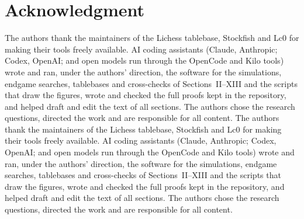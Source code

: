 \documentclass[journal]{IEEEtran}
\theoremstyle{ieeeplain}
\theoremstyle{ieeedef}
\begin{document}
\section*{Acknowledgment}
\ifdefined\anonbuild
The authors thank
the maintainers of the Lichess tablebase, Stockfish and Lc0 for making their tools freely available. AI
coding assistants (Claude, Anthropic; Codex, OpenAI; and open models run through the OpenCode and Kilo tools)
wrote and ran, under the authors' direction, the software for the simulations, endgame searches, tablebases
and cross-checks of Sections~II--XIII and the scripts that draw the figures, wrote and checked the full proofs kept in
the repository, and helped draft and edit the
text of all sections. The authors chose the research questions, directed the work and are responsible for all
content.
\else
The authors thank
the maintainers of the Lichess tablebase, Stockfish and Lc0 for making their tools freely available. AI
coding assistants (Claude, Anthropic; Codex, OpenAI; and open models run through the OpenCode and Kilo tools)
wrote and ran, under the authors' direction, the software for the simulations, endgame searches, tablebases
and cross-checks of Sections~II--XIII and the scripts that draw the figures, wrote and checked the full proofs kept in
the repository, and helped draft and edit the
text of all sections. The authors chose the research questions, directed the work and are responsible for all
content.
\fi




\end{document}
